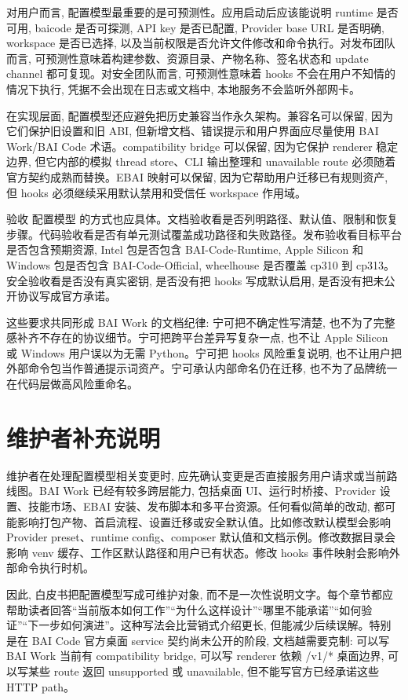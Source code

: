对用户而言, 配置模型最重要的是可预测性。应用启动后应该能说明 runtime 是否可用, baicode 是否可探测, API key 是否已配置, Provider base URL 是否明确, workspace 是否已选择, 以及当前权限是否允许文件修改和命令执行。对发布团队而言, 可预测性意味着构建参数、资源目录、产物名称、签名状态和 update channel 都可复现。对安全团队而言, 可预测性意味着 hooks 不会在用户不知情的情况下执行, 凭据不会出现在日志或文档中, 本地服务不会监听外部网卡。

在实现层面, 配置模型还应避免把历史兼容当作永久架构。兼容名可以保留, 因为它们保护旧设置和旧 ABI, 但新增文档、错误提示和用户界面应尽量使用 BAI Work/BAI Code 术语。compatibility bridge 可以保留, 因为它保护 renderer 稳定边界, 但它内部的模拟 thread store、CLI 输出整理和 unavailable route 必须随着官方契约成熟而替换。EBAI 映射可以保留, 因为它帮助用户迁移已有规则资产, 但 hooks 必须继续采用默认禁用和受信任 workspace 作用域。

验收 配置模型 的方式也应具体。文档验收看是否列明路径、默认值、限制和恢复步骤。代码验收看是否有单元测试覆盖成功路径和失败路径。发布验收看目标平台是否包含预期资源, Intel 包是否包含 BAI-Code-Runtime, Apple Silicon 和 Windows 包是否包含 BAI-Code-Official, wheelhouse 是否覆盖 cp310 到 cp313。安全验收看是否没有真实密钥, 是否没有把 hooks 写成默认启用, 是否没有把未公开协议写成官方承诺。

这些要求共同形成 BAI Work 的文档纪律: 宁可把不确定性写清楚, 也不为了完整感补齐不存在的协议细节。宁可把跨平台差异写复杂一点, 也不让 Apple Silicon 或 Windows 用户误以为无需 Python。宁可把 hooks 风险重复说明, 也不让用户把外部命令包当作普通提示词资产。宁可承认内部命名仍在迁移, 也不为了品牌统一在代码层做高风险重命名。

\section{维护者补充说明}

维护者在处理配置模型相关变更时, 应先确认变更是否直接服务用户请求或当前路线图。BAI Work 已经有较多跨层能力, 包括桌面 UI、运行时桥接、Provider 设置、技能市场、EBAI 安装、发布脚本和多平台资源。任何看似简单的改动, 都可能影响打包产物、首启流程、设置迁移或安全默认值。比如修改默认模型会影响 Provider preset、runtime config、composer 默认值和文档示例。修改数据目录会影响 venv 缓存、工作区默认路径和用户已有状态。修改 hooks 事件映射会影响外部命令执行时机。

因此, 白皮书把配置模型写成可维护对象, 而不是一次性说明文字。每个章节都应帮助读者回答“当前版本如何工作”“为什么这样设计”“哪里不能承诺”“如何验证”“下一步如何演进”。这种写法会比营销式介绍更长, 但能减少后续误解。特别是在 BAI Code 官方桌面 service 契约尚未公开的阶段, 文档越需要克制: 可以写 BAI Work 当前有 compatibility bridge, 可以写 renderer 依赖 /v1/* 桌面边界, 可以写某些 route 返回 unsupported 或 unavailable, 但不能写官方已经承诺这些 HTTP path。

